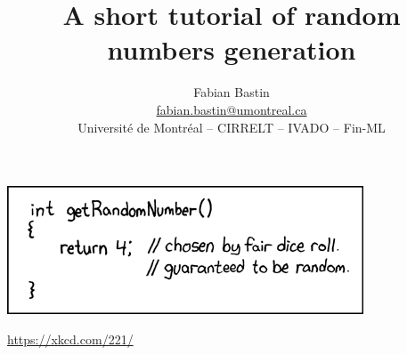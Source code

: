 \documentclass{beamer}
\title[Random Numbers Generation]{A short tutorial of random numbers generation}
\author[Fabian Bastin]{Fabian Bastin \\ \url{fabian.bastin@umontreal.ca} \\ Université de Montréal -- CIRRELT -- IVADO -- Fin-ML}
\date{}
\begin{document}
	
	\frame{\titlepage}
	
\begin{frame}

\begin{center}
	\href{https://xkcd.com/221/}{\includegraphics[scale=0.75]{imgs/random_number.png}}
\begin{small}
	\url{https://xkcd.com/221/}
\end{small}
\end{center}

\end{frame}
	
\end{document}
